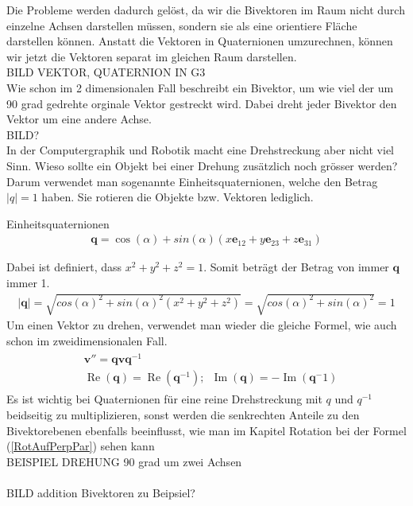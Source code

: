 Die Probleme werden dadurch gelöst, da wir die Bivektoren im Raum nicht durch einzelne Achsen darstellen müssen, sondern sie als eine orientiere Fläche darstellen können. Anstatt die Vektoren in Quaternionen umzurechnen, können wir jetzt die Vektoren separat im gleichen Raum darstellen. 
\\BILD VEKTOR, QUATERNION IN G3\\
Wie schon im 2 dimensionalen Fall beschreibt ein Bivektor, um wie viel der um 90 grad gedrehte orginale Vektor gestreckt wird. Dabei dreht jeder Bivektor den Vektor um eine andere Achse.
\\BILD?\\
In der Computergraphik und Robotik macht eine Drehstreckung aber nicht viel Sinn. Wieso sollte ein Objekt bei einer Drehung zusätzlich noch grösser werden? Darum verwendet man sogenannte Einheitsquaternionen, welche den Betrag $|q|=1$ haben. Sie rotieren die Objekte bzw. Vektoren lediglich.
\begin{definition}
	Einheitsquaternionen
	\begin{align}
		\mathbf{q} = \cos(\alpha) + sin(\alpha)(x\mathbf{e}_{12} + y\mathbf{e}_{23} + z\mathbf{e}_{31})
	\end{align}
\end{definition}
Dabei ist definiert, dass $x^2+y^2+z^2=1$. Somit beträgt der Betrag von immer $\mathbf{q}$ immer 1.
\begin{align}
	|\mathbf{q}| = \sqrt{cos(\alpha)^2 + sin(\alpha)^2(x^2+y^2+z^2) } = \sqrt{cos(\alpha)^2 + sin(\alpha)^2} = 1
\end{align}
Um einen Vektor zu drehen, verwendet man wieder die gleiche Formel, wie auch schon im zweidimensionalen Fall.
\begin{align} \label{QuatRotGA}
	\begin{split} 
		&\mathbf{v}'' = \mathbf{qvq}^{-1}\\
		&\operatorname{Re}(\mathbf{q}) = \operatorname{Re}(\mathbf{q}^{-1});\enspace \operatorname{Im}(\mathbf{q}) = -\operatorname{Im}(\mathbf{q}^-1)
	\end{split}
\end{align}
Es ist wichtig bei Quaternionen für eine reine Drehstreckung mit $q$ und $q^{-1}$ beidseitig zu multiplizieren, sonst werden die senkrechten Anteile zu den Bivektorebenen ebenfalls beeinflusst, wie man im Kapitel Rotation bei der Formel (\ref{RotAufPerpPar}) sehen kann
\\BEISPIEL DREHUNG 90 grad um zwei Achsen\\
\\BILD addition Bivektoren zu Beipsiel?\\
